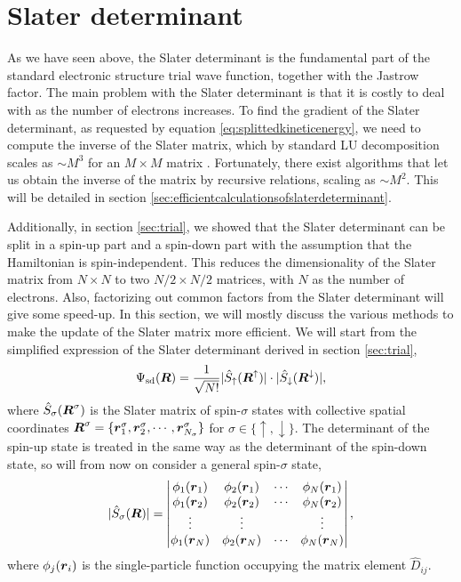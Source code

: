 \section{Slater determinant}
As we have seen above, the Slater determinant is the fundamental part of the standard electronic structure trial wave function, together with the Jastrow factor. The main problem with the Slater determinant is that it is costly to deal with as the number of electrons increases. To find the gradient of the Slater determinant, as requested by equation \eqref{eq:splittedkineticenergy}, we need to compute the inverse of the Slater matrix, which by standard LU decomposition scales as $\sim M^3$ for an $M\times M$ matrix \supercite{trahan_computational_2006}. Fortunately, there exist algorithms that let us obtain the inverse of the matrix by recursive relations, scaling as $\sim M^2$. This will be detailed in section \ref{sec:efficientcalculationsofslaterdeterminant}.

Additionally, in section \ref{sec:trial}, we showed that the Slater determinant can be split in a spin-up part and a spin-down part with the assumption that the Hamiltonian is spin-independent. This reduces the dimensionality of the Slater matrix from $N\times N$ to two $N/2\times N/2$ matrices, with $N$ as the number of electrons. Also, factorizing out common factors from the Slater determinant will give some speed-up. In this section, we will mostly discuss the various methods to make the update of the Slater matrix more efficient. We will start from the simplified expression of the Slater determinant derived in section \ref{sec:trial},
\begin{equation}
\Psi_{\text{sd}}(\boldsymbol{{R}})=\frac{1}{\sqrt{N!}}|\hat{S}_{\uparrow}(\boldsymbol{{R}}^{\uparrow})|\cdot|\hat{S}_{\downarrow}(\boldsymbol{{R}}^{\downarrow})|,
\end{equation}
where $\hat{S}_{\sigma}(\boldsymbol{{R}}^{\sigma})$ is the Slater matrix of spin-$\sigma$ states with collective spatial coordinates $\boldsymbol{{R}}^{\sigma}=\{\boldsymbol{{r}}_1^{\sigma},\boldsymbol{{r}}_2^{\sigma},\cdots,\boldsymbol{{r}}_{N_{\sigma}}^{\sigma}\}$ for $\sigma\in\{\uparrow, \downarrow\}$. The determinant of the spin-up state is treated in the same way as the determinant of the spin-down state, so will from now on consider a general spin-$\sigma$ state,
\begin{equation}
|\hat{S}_{\sigma}(\boldsymbol{{R}})|=\begin{vmatrix}
\phi_1(\boldsymbol{r}_1) & \phi_2(\boldsymbol{r}_1) & \cdots & \phi_{N}(\boldsymbol{r}_1)\\
\phi_1(\boldsymbol{r}_2) & \phi_2(\boldsymbol{r}_2) & \cdots & \phi_{N}(\boldsymbol{r}_2)\\
\vdots & \vdots & & \vdots \\
\phi_1(\boldsymbol{r}_{N}) & \phi_2(\boldsymbol{r}_{N}) & \cdots & \phi_{N}(\boldsymbol{r}_{N})
\end{vmatrix},
\end{equation}
where $\phi_j(\boldsymbol{{r}}_i)$ is the single-particle function occupying the matrix element $\hat{D}_{ij}$.

